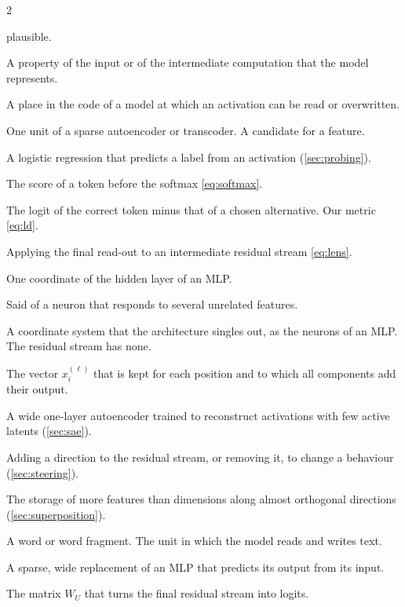 {\begin{multicols}{2}
\begin{description}[style=sameline, leftmargin=0pt, itemsep=1.5pt, font=\normalfont\bfseries]
plausible.
\item[Feature.] A property of the input or of the intermediate computation that the model represents.
\item[Hook.] A place in the code of a model at which an activation can be read or overwritten.
\item[Latent.] One unit of a sparse autoencoder or transcoder. A candidate for a feature.
\item[Linear probe.] A logistic regression that predicts a label from an activation (\cref{sec:probing}).
\item[Logit.] The score of a token before the softmax \eqref{eq:softmax}.
\item[Logit difference.] The logit of the correct token minus that of a chosen alternative. Our metric
\eqref{eq:ld}.
\item[Logit lens.] Applying the final read-out to an intermediate residual stream \eqref{eq:lens}.
\item[Neuron.] One coordinate of the hidden layer of an MLP.
\item[Polysemantic.] Said of a neuron that responds to several unrelated features.
\item[Privileged basis.] A coordinate system that the architecture singles out, as the neurons of an MLP. The
residual stream has none.
\item[Residual stream.] The vector $x_i^{(\ell)}$ that is kept for each position and to which all components
add their output.
\item[Sparse autoencoder.] A wide one-layer autoencoder trained to reconstruct activations with few active
latents (\cref{sec:sae}).
\item[Steering.] Adding a direction to the residual stream, or removing it, to change a behaviour
(\cref{sec:steering}).
\item[Superposition.] The storage of more features than dimensions along almost orthogonal directions
(\cref{sec:superposition}).
\item[Token.] A word or word fragment. The unit in which the model reads and writes text.
\item[Transcoder.] A sparse, wide replacement of an MLP that predicts its output from its input.
\item[Unembedding.] The matrix $W_U$ that turns the final residual stream into logits.
\end{description}
\end{multicols}
}

